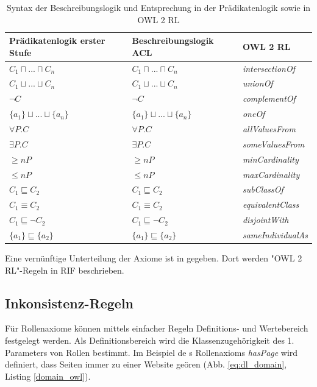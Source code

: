 \documentclass[runningheads,a4paper]{llncs}
\begin{document}
\begin{table}[h]
\begin{tabular}{|l|l|l|}
\hline
Prädikatenlogik erster Stufe & Beschreibungslogik ACL & OWL 2 RL \\ \hline
$ C_1 \sqcap ... \sqcap C_n $ & $ C_1 \sqcap ... \sqcap C_n $ & \textit{intersectionOf} \\ \hline
$ C_1 \sqcup ... \sqcup C_n $ & $ C_1 \sqcup ... \sqcup C_n $ & \textit{unionOf} \\ \hline
$ \neg C $ & $ \neg C $ & \textit{complementOf} \\ \hline
$ \{a_1\} \sqcup ... \sqcup \{a_n\} $ & $ \{a_1\} \sqcup ... \sqcup \{a_n\} $ & \textit{oneOf} \\ \hline
$ \forall P.C $ & $ \forall P.C $ & \textit{allValuesFrom} \\ \hline
$ \exists P.C $ & $ \exists P.C $ & \textit{someValuesFrom} \\ \hline
$ \geq n P $ & $ \geq n P $ & \textit{minCardinality} \\ \hline
$ \leq n P $ & $ \leq n P $ & \textit{maxCardinality} \\ \hline
$ C_1 \sqsubseteq C_2 $ & $ C_1 \sqsubseteq C_2 $ & \textit{subClassOf} \\ \hline
$ C_1 \equiv C_2 $ & $ C_1 \equiv C_2 $ & \textit{equivalentClass} \\ \hline
$ C_1 \sqsubseteq \neg C_2 $ & $ C_1 \sqsubseteq \neg C_2 $ & \textit{disjointWith} \\ \hline
$ \{a_1\} \sqsubseteq \{a_2\} $ & $ \{a_1\} \sqsubseteq \{a_2\} $ & \textit{sameIndividualAs} \\ \hline
\end{tabular}
\label{table:description_logic}
\caption{Syntax der Beschreibungslogik und Entsprechung in der Prädikatenlogik sowie in OWL 2 RL}
\end{table}

Eine vernünftige Unterteilung der Axiome ist in \cite{web_primer}   gegeben. 
Dort werden "{}OWL 2 RL"{}-Regeln in RIF \cite{owl2rif} beschrieben.

\subsection{Inkonsistenz-Regeln}
\label{sec:rule_inconsistency}

Für Rollenaxiome können mittels einfacher Regeln Definitions- und Wertebereich festgelegt werden. 
Als Definitionsbereich wird die Klassenzugehörigkeit des 1. Parameters von Rollen bestimmt.
Im Beispiel de s Rollenaxioms \textit{hasPage} wird definiert, dass Seiten immer zu einer Website geören (Abb. \ref{eq:dl_domain}, Listing \ref{domain_owl}).
\end{document}
